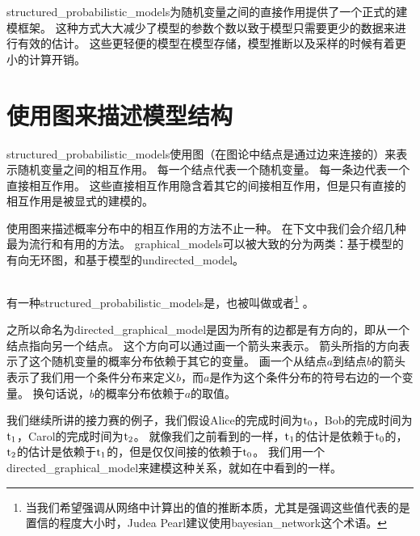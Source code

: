 \gls{structured_probabilistic_models}为随机变量之间的直接作用提供了一个正式的建模框架。
这种方式大大减少了模型的参数个数以致于模型只需要更少的数据来进行有效的估计。
这些更轻便的模型在模型存储，模型推断以及采样的时候有着更小的计算开销。


\section{使用图来描述模型结构}
\label{sec:using_graphs_to_describe_model_structure}


\gls{structured_probabilistic_models}使用图（在图论中结点是通过边来连接的）来表示随机变量之间的相互作用。
每一个结点代表一个随机变量。
每一条边代表一个直接相互作用。
这些直接相互作用隐含着其它的间接相互作用，但是只有直接的相互作用是被显式的建模的。


使用图来描述概率分布中的相互作用的方法不止一种。
在下文中我们会介绍几种最为流行和有用的方法。
\gls{graphical_models}可以被大致的分为两类：基于模型的有向无环图，和基于模型的\gls{undirected_model}。


\subsection{}
\label{sec:directed_models}


有一种\gls{structured_probabilistic_models}是，也被叫做或者\footnote{当我们希望强调从网络中计算出的值的推断本质，尤其是强调这些值代表的是置信的程度大小时，Judea Pearl建议使用\gls{bayesian_network}这个术语。} \citep{pearl85bayesian}。


之所以命名为\gls{directed_graphical_model}是因为所有的边都是有方向的，即从一个结点指向另一个结点。
这个方向可以通过画一个箭头来表示。
箭头所指的方向表示了这个随机变量的概率分布依赖于其它的变量。
画一个从结点$a$到结点$b$的箭头表示了我们用一个条件分布来定义$b$，而$a$是作为这个条件分布的符号右边的一个变量。
换句话说，$b$的概率分布依赖于$a$的取值。


我们继续所讲的接力赛的例子，我们假设Alice的完成时间为$\mathrm{t}_0$，Bob的完成时间为$\mathrm{t}_1$，Carol的完成时间为$\mathrm{t}_2$。
就像我们之前看到的一样，$\mathrm{t}_1$的估计是依赖于$\mathrm{t}_0$的，$\mathrm{t}_2$的估计是依赖于$\mathrm{t}_1$的，但是仅仅间接的依赖于$\mathrm{t}_0$。
我们用一个\gls{directed_graphical_model}来建模这种关系，就如在中看到的一样。

